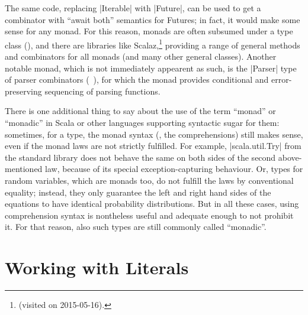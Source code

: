 The same code, replacing |Iterable| with |Future|, can be used to get a combinator with
\enquote{await both} semantics for Futures; in fact, it would make some sense for any monad. For
this reason, monads are often subsumed under a type class (), and there
are libraries like
Scalaz,\footnote{\protect{}
  (visited on 2015-05-16).} providing a range of general methods and combinators for all monads (and
many other general classes). Another notable monad, which is not immediately appearent as such, is
the |Parser| type of parser combinators (\cf~), for which the monad
provides conditional and error-preserving sequencing of parsing functions.

There is one additional thing to say about the use of the term \enquote{monad} or \enquote{monadic}
in Scala or other languages supporting syntactic sugar for them: sometimes, for a type, the monad
syntax (\ie, the comprehensions) still makes sense, even if the monad laws are not strictly
fulfilled. For example, |scala.util.Try| from the standard library does not behave the same on both
sides of the second above-mentioned law, because of its special exception-capturing behaviour. Or,
types for random variables, which are monads too, do not fulfill the laws by conventional equality;
instead, they only guarantee the left and right hand sides of the equations to have identical
probability distributions. But in all these cases, using comprehension syntax is nontheless useful
and adequate enough to not prohibit it. For that reason, also such types are still commonly called
\enquote{monadic}.



\section{Working with Literals}
\label{sec:literals}

